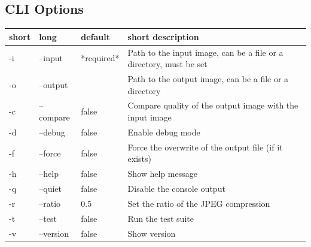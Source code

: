 \subsection{CLI Options}
\label{annex:cli-options}

\begin{table}[H]
    \begin{tabular}{|l|l|l|l|}
        \hline
        short & long      & default    & short description                                                  \\ \hline
        -i    & --input   & *required* & Path to the input image, can be a file or a directory, must be set \\ \hline
        -o    & --output  &            & Path to the output image, can be a file or a directory             \\ \hline
        -c    & --compare & false      & Compare quality of the output image with the input image           \\ \hline
        -d    & --debug   & false      & Enable debug mode                                                  \\ \hline
        -f    & --force   & false      & Force the overwrite of the output file (if it exists)              \\ \hline
        -h    & --help    & false      & Show  help message                                                 \\ \hline
        -q    & --quiet   & false      & Disable the console output                                         \\ \hline
        -r    & --ratio   & 0.5        & Set the ratio of the JPEG compression                              \\ \hline
        -t    & --test    & false      & Run the test suite                                                 \\ \hline
        -v    & --version & false      & Show version                                                       \\ \hline
    \end{tabular}
\end{table}

